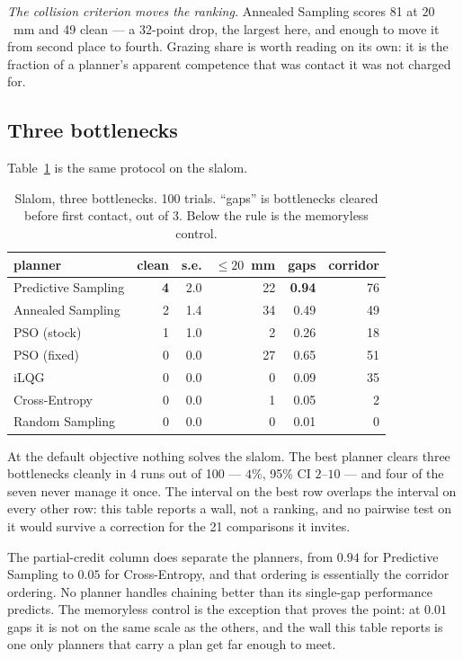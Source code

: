 \documentclass[conference]{IEEEtran}
\begin{document}
\emph{The collision criterion moves the ranking.} Annealed Sampling scores 81 at
$20$~mm and 49 clean --- a 32-point drop, the largest here, and enough to move it
from second place to fourth. Grazing share is worth reading on its own: it is
the fraction of a planner's apparent competence that was contact it was not
charged for.

\subsection{Three bottlenecks}
\label{sec:planners-three}

Table~\ref{tab:slalom} is the same protocol on the slalom.

\begin{table}[t]
\caption{Slalom, three bottlenecks. 100 trials. ``gaps'' is bottlenecks cleared
before first contact, out of 3. Below the rule is the memoryless control.}
\label{tab:slalom}
\centering
\begin{tabular}{@{}lrrrrr@{}}
\toprule
planner & clean & s.e. & $\leq 20$~mm & gaps & corridor \\
\midrule
Predictive Sampling  & \textbf{4} & 2.0 & 22 & \textbf{0.94} & 76 \\
Annealed Sampling    & 2 & 1.4 & 34 & 0.49 & 49 \\
PSO (stock)          & 1 & 1.0 & 2  & 0.26 & 18 \\
PSO (fixed)          & 0 & 0.0 & 27 & 0.65 & 51 \\
iLQG                 & 0 & 0.0 & 0  & 0.09 & 35 \\
Cross-Entropy        & 0 & 0.0 & 1  & 0.05 & 2 \\
\midrule
Random Sampling      & 0 & 0.0 & 0  & 0.01 & 0 \\
\bottomrule
\end{tabular}
\end{table}

At the default objective nothing solves the slalom. The best planner clears
three bottlenecks cleanly in 4 runs out of 100 --- $4\%$, 95\% CI $2$--$10$ ---
and four of the seven never manage it once. The interval on the best row
overlaps the interval on every other row: this table reports a wall, not a
ranking, and no pairwise test on it would survive a correction for the 21
comparisons it invites.

The partial-credit column does separate the planners, from $0.94$ for Predictive
Sampling to $0.05$ for Cross-Entropy, and that ordering is essentially the
corridor ordering. No planner handles chaining better than its single-gap
performance predicts. The memoryless control is the exception that proves the
point: at $0.01$ gaps it is not on the same scale as the others, and the wall
this table reports is one only planners that carry a plan get far enough to
meet.
\end{document}
